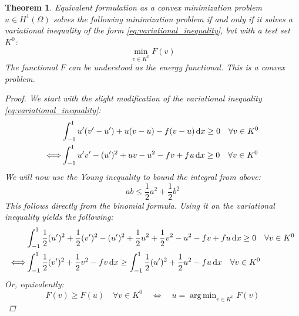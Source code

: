 \documentclass[headsepline,footsepline,footinclude=false,oneside,fontsize=11pt,paper=a4,listof=totoc,bibliography=totoc]{scrbook} %
\DeclareMathOperator*{\argmin}{arg\,min}
\newtheorem{theorem}{Theorem}
\begin{document}
\begin{theorem} Equivalent formulation as a convex minimization problem\newline
	$u \in H^1(\Omega)$ solves the following minimization problem if and only if it solves a variational inequality of the form \eqref{eq:variational_inequality}, but with a test set $K^0$:
	\begin{equation} \label{eq:minimization_problem_lemma}
	\min_{v \in K^0} F(v)
	\end{equation}
	The functional $F$ can be understood as the energy functional. This is a convex problem.
	\begin{proof}
	We start with the slight modification of the variational inequality \eqref{eq:variational_inequality}:
	\begin{align*}
		&\int_{-1}^1 u'(v'-u') + u(v-u) - f(v-u) \dif x \geq 0 \quad \forall v \in K^0 \\
		\Longleftrightarrow & \int_{-1}^1 u'v' - (u')^2 + uv - u^2 - fv + fu \dif x \geq 0 \quad \forall v \in K^0 \\
	\end{align*}
	We will now use the Young inequality to bound the integral from above:
	\begin{equation}
	ab \leq \frac{1}{2} a^2 + \frac{1}{2} b^2 \label{eq:binomial_inequality}
	\end{equation}
	This follows directly from the binomial formula. Using it on the variational inequality yields the following:
	\begin{align*}
	&\int_{-1}^1 \frac{1}{2} (u')^2 + \frac{1}{2} (v')^2 - (u')^2 + \frac{1}{2} u^2 + \frac{1}{2} v^2 - u^2 - fv + fu \dif x \geq 0 \quad \forall v \in K^0 \\
	\Longleftrightarrow & \int_{-1}^1 \frac{1}{2} (v')^2 + \frac{1}{2} v^2 - fv \dif x \geq \int_{-1}^1 \frac{1}{2} (u')^2 + \frac{1}{2} u^2 - fu \dif x \quad \forall v \in K^0
	\end{align*}
	Or, equivalently:
	\begin{equation*}
	F(v) \geq F(u) \quad \forall v \in K^0
	\quad \Longleftrightarrow \quad u = \argmin_{v \in K^0} F(v)
	\end{equation*}
	

\end{proof}
\end{theorem}
\end{document}
